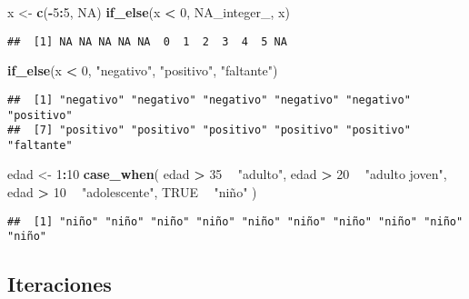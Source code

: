 \documentclass[]{book}
\newenvironment{Shaded}{\begin{snugshade}}{\end{snugshade}}
\newcommand{\DecValTok}[1]{\textcolor[rgb]{0.00,0.00,0.81}{#1}}
\newcommand{\KeywordTok}[1]{\textcolor[rgb]{0.13,0.29,0.53}{\textbf{#1}}}
\newcommand{\NormalTok}[1]{#1}
\newcommand{\OperatorTok}[1]{\textcolor[rgb]{0.81,0.36,0.00}{\textbf{#1}}}
\newcommand{\OtherTok}[1]{\textcolor[rgb]{0.56,0.35,0.01}{#1}}
\newcommand{\StringTok}[1]{\textcolor[rgb]{0.31,0.60,0.02}{#1}}
\begin{document}
\begin{Shaded}
\begin{Highlighting}[]
\NormalTok{x <-}\StringTok{ }\KeywordTok{c}\NormalTok{(}\OperatorTok{-}\DecValTok{5}\OperatorTok{:}\DecValTok{5}\NormalTok{, }\OtherTok{NA}\NormalTok{)}
\KeywordTok{if_else}\NormalTok{(x }\OperatorTok{<}\StringTok{ }\DecValTok{0}\NormalTok{, }\OtherTok{NA_integer_}\NormalTok{, x)}
\end{Highlighting}
\end{Shaded}

\begin{verbatim}
##  [1] NA NA NA NA NA  0  1  2  3  4  5 NA
\end{verbatim}

\begin{Shaded}
\begin{Highlighting}[]
\KeywordTok{if_else}\NormalTok{(x }\OperatorTok{<}\StringTok{ }\DecValTok{0}\NormalTok{, }\StringTok{"negativo"}\NormalTok{, }\StringTok{"positivo"}\NormalTok{, }\StringTok{"faltante"}\NormalTok{)}
\end{Highlighting}
\end{Shaded}

\begin{verbatim}
##  [1] "negativo" "negativo" "negativo" "negativo" "negativo" "positivo"
##  [7] "positivo" "positivo" "positivo" "positivo" "positivo" "faltante"
\end{verbatim}

\begin{Shaded}
\begin{Highlighting}[]
\NormalTok{edad <-}\StringTok{ }\DecValTok{1}\OperatorTok{:}\DecValTok{10}
\KeywordTok{case_when}\NormalTok{(}
\NormalTok{  edad }\OperatorTok{>}\StringTok{ }\DecValTok{35} \OperatorTok{~}\StringTok{ "adulto"}\NormalTok{,}
\NormalTok{  edad }\OperatorTok{>}\StringTok{ }\DecValTok{20} \OperatorTok{~}\StringTok{ "adulto joven"}\NormalTok{,}
\NormalTok{  edad }\OperatorTok{>}\StringTok{ }\DecValTok{10} \OperatorTok{~}\StringTok{ "adolescente"}\NormalTok{,}
  \OtherTok{TRUE} \OperatorTok{~}\StringTok{ "niño"}
\NormalTok{)}
\end{Highlighting}
\end{Shaded}

\begin{verbatim}
##  [1] "niño" "niño" "niño" "niño" "niño" "niño" "niño" "niño" "niño" "niño"
\end{verbatim}

\hypertarget{iteraciones}{%
\subsection{Iteraciones}\label{iteraciones}}
\end{document}
